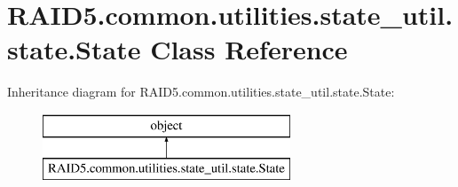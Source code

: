 \hypertarget{class_r_a_i_d5_1_1common_1_1utilities_1_1state__util_1_1state_1_1_state}{}\section{R\+A\+I\+D5.\+common.\+utilities.\+state\+\_\+util.\+state.\+State Class Reference}
\label{class_r_a_i_d5_1_1common_1_1utilities_1_1state__util_1_1state_1_1_state}
Inheritance diagram for R\+A\+I\+D5.\+common.\+utilities.\+state\+\_\+util.\+state.\+State\+:\begin{figure}[H]
\begin{center}
\leavevmode
\includegraphics[height=2.000000cm]{class_r_a_i_d5_1_1common_1_1utilities_1_1state__util_1_1state_1_1_state}
\end{center}
\end{figure}
